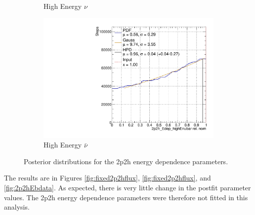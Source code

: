 \begin{figure}
\begin{subfigure}{.48\textwidth}
  \caption{High Energy $\nu$}
\end{subfigure}
\begin{subfigure}{.48\textwidth}
  \centering
  \includegraphics[width=0.73\linewidth]{figs/2p2h_Edep_highEnubar.pdf}
  \caption{High Energy $\bar{\nu}$}
\end{subfigure}
\caption{Posterior distributions for the 2p2h energy dependence parameters.}
\label{fig:2p2hEdepdist}
\end{figure}

The results are in Figures \ref{fig:fixed2p2hflux}, \ref{fig:fixed2p2hflux}, and \ref{fig:2p2hEbdata}. As expected, there is very little change in the postfit parameter values. The 2p2h energy dependence parameters were therefore not fitted in this analysis.

